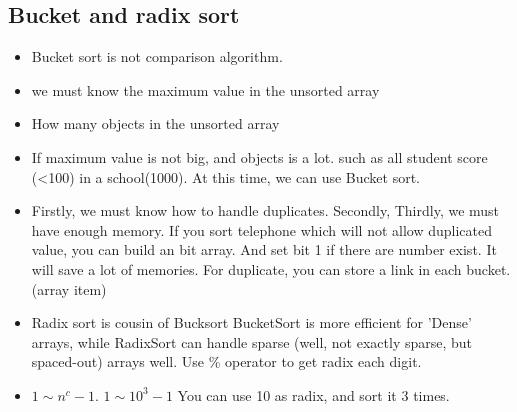 \documentclass[a4paper,11pt,twoside]{book}
\begin{document}
\subsection{Bucket and radix sort}
\begin{itemize}


\item Bucket sort is not comparison algorithm.  
\item we must know the maximum value in the unsorted array
\item How many objects in the unsorted array
\item If maximum value is not big, and objects is a lot. such as all student score (<100) in a school(1000). At this time, we can use Bucket sort. 
	
\item Firstly, we must know how to handle duplicates. Secondly,  Thirdly, we must have enough memory. If you sort telephone which will not allow duplicated value, you can build an bit array. And set bit 1 if there are number exist. It will save a lot of memories.   For duplicate, you can store a link in each bucket. (array item)

\item Radix sort is cousin of Bucksort BucketSort is more efficient for 'Dense' arrays, while RadixSort can handle sparse (well, not exactly sparse, but spaced-out) arrays well. Use \% operator to get radix each digit. 

\item $ 1\sim n^c-1$. $ 1\sim10^3-1 $  You can use 10 as radix, and sort it 3 times. 

\end{itemize}
\end{document}
